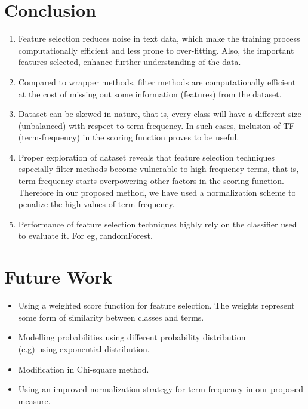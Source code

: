 \documentclass[a4paper, 14pt]{article}
\begin{document}
\section{Conclusion}
\begin{justify}

\begin{enumerate}

  \item Feature selection reduces noise in text data, which make the training process computationally efficient and less prone to over-fitting. Also, the important features selected, enhance further understanding of the data.
  
  \item Compared to wrapper methods, filter methods are computationally efficient at the cost of missing out some information (features) from the dataset.
  
  \item Dataset can be skewed in nature, that is, every class will have a different size (unbalanced) with respect to term-frequency. In such cases, inclusion of TF (term-frequency) in the scoring function proves to be useful.
  

  \item Proper exploration of dataset reveals that feature selection techniques especially filter methods become vulnerable to high frequency terms, that is, term frequency starts overpowering other factors in the scoring function. Therefore in our proposed method, we have used a normalization scheme to penalize the high values of term-frequency.
  
  
  \item Performance of feature selection techniques highly rely on the classifier used to evaluate it. For eg, randomForest. 
  
\end{enumerate}


\end{justify}


\section{Future Work}
\begin{itemize}

\item Using a weighted score function for feature selection. The weights represent some form of similarity between classes and terms.

\item Modelling probabilities using different probability distribution \\(e.g) using exponential distribution.

\item Modification in Chi-square method.

\item Using an improved normalization strategy for term-frequency in our proposed measure. 
    
\end{itemize}
\clearpage

\newpage


\end{document}

